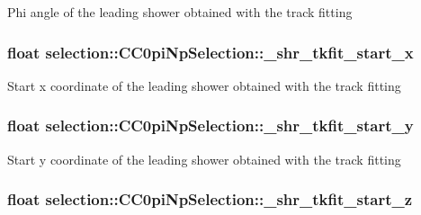 Phi angle of the leading shower obtained with the track fitting \hypertarget{classselection_1_1CC0piNpSelection_a44002e3cc4d16dce6e6f61ee3a2bae6a}{
\subsubsection[{\-\_\-shr\-\_\-tkfit\-\_\-start\-\_\-x}]{\setlength{\rightskip}{0pt plus 5cm}float selection\-::\-C\-C0pi\-Np\-Selection\-::\-\_\-shr\-\_\-tkfit\-\_\-start\-\_\-x\hspace{0.3cm}{\ttfamily [private]}}}\label{classselection_1_1CC0piNpSelection_a44002e3cc4d16dce6e6f61ee3a2bae6a}
Start x coordinate of the leading shower obtained with the track fitting \hypertarget{classselection_1_1CC0piNpSelection_acd1826c44855b71bce92253f7ac1a758}{
\subsubsection[{\-\_\-shr\-\_\-tkfit\-\_\-start\-\_\-y}]{\setlength{\rightskip}{0pt plus 5cm}float selection\-::\-C\-C0pi\-Np\-Selection\-::\-\_\-shr\-\_\-tkfit\-\_\-start\-\_\-y\hspace{0.3cm}{\ttfamily [private]}}}\label{classselection_1_1CC0piNpSelection_acd1826c44855b71bce92253f7ac1a758}
Start y coordinate of the leading shower obtained with the track fitting \hypertarget{classselection_1_1CC0piNpSelection_a4d3591a8bb7abd9e320f35ca3bf311c2}{
\subsubsection[{\-\_\-shr\-\_\-tkfit\-\_\-start\-\_\-z}]{\setlength{\rightskip}{0pt plus 5cm}float selection\-::\-C\-C0pi\-Np\-Selection\-::\-\_\-shr\-\_\-tkfit\-\_\-start\-\_\-z\hspace{0.3cm}{\ttfamily [private]}}}\label{classselection_1_1CC0piNpSelection_a4d3591a8bb7abd9e320f35ca3bf311c2}
